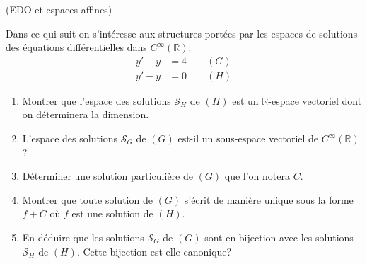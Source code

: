 \documentclass[a4paper,12pt,reqno]{amsart}
\begin{document}
\begin{exo} (EDO et espaces affines)

  Dans ce qui suit on s'intéresse aux structures portées par les espaces de solutions des équations différentielles dans $C^{\infty}(\mathbb{R})$:\vspace{-4mm}
    \begin{align*}
      y' - y &= 4 \qquad (G)\\
      y' - y &= 0 \qquad (H)
    \end{align*}

  \begin{enumerate}
    \item Montrer que l'espace des solutions $\mathcal{S}_{H}$ de $(H)$ est un $\mathbb{R}$-espace vectoriel dont on déterminera la dimension.

    \item L'espace des solutions $\mathcal{S}_{G}$ de $(G)$ est-il un sous-espace vectoriel de $C^{\infty}(\mathbb{R})$?

    \item Déterminer une solution particulière de $(G)$ que l'on notera $C$.

    \item Montrer que toute solution de $(G)$ s'écrit de manière unique sous la forme $f+C$ où $f$ est une solution de $(H)$.

    \item\hard En déduire que les solutions $\mathcal{S}_{G}$ de $(G)$ sont en bijection avec les solutions $\mathcal{S}_{H}$ de $(H)$. Cette bijection est-elle canonique?

  \end{enumerate}
\end{exo}
\end{document}
